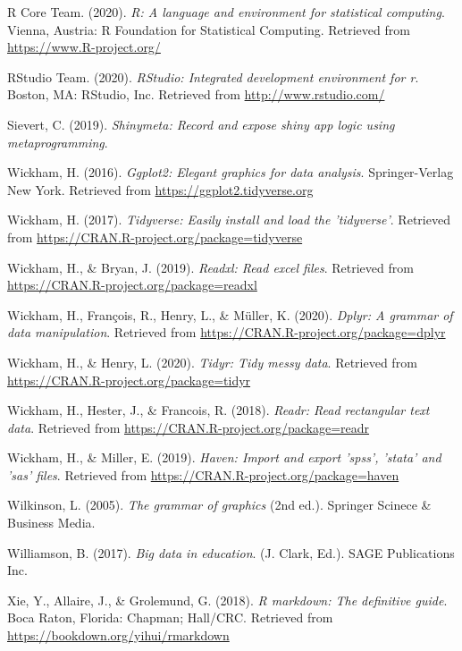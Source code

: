 \documentclass[english,man,floatsintext]{apa6}
\begin{document}
\leavevmode\hypertarget{ref-R-base}{}%
R Core Team. (2020). \emph{R: A language and environment for statistical computing}. Vienna, Austria: R Foundation for Statistical Computing. Retrieved from \url{https://www.R-project.org/}

\leavevmode\hypertarget{ref-rstudio}{}%
RStudio Team. (2020). \emph{RStudio: Integrated development environment for r}. Boston, MA: RStudio, Inc. Retrieved from \url{http://www.rstudio.com/}

\leavevmode\hypertarget{ref-R-shinymeta}{}%
Sievert, C. (2019). \emph{Shinymeta: Record and expose shiny app logic using metaprogramming}.

\leavevmode\hypertarget{ref-R-ggplot2}{}%
Wickham, H. (2016). \emph{Ggplot2: Elegant graphics for data analysis}. Springer-Verlag New York. Retrieved from \url{https://ggplot2.tidyverse.org}

\leavevmode\hypertarget{ref-tidyverse}{}%
Wickham, H. (2017). \emph{Tidyverse: Easily install and load the 'tidyverse'}. Retrieved from \url{https://CRAN.R-project.org/package=tidyverse}

\leavevmode\hypertarget{ref-R-readxl}{}%
Wickham, H., \& Bryan, J. (2019). \emph{Readxl: Read excel files}. Retrieved from \url{https://CRAN.R-project.org/package=readxl}

\leavevmode\hypertarget{ref-R-dplyr}{}%
Wickham, H., François, R., Henry, L., \& Müller, K. (2020). \emph{Dplyr: A grammar of data manipulation}. Retrieved from \url{https://CRAN.R-project.org/package=dplyr}

\leavevmode\hypertarget{ref-R-tidyr}{}%
Wickham, H., \& Henry, L. (2020). \emph{Tidyr: Tidy messy data}. Retrieved from \url{https://CRAN.R-project.org/package=tidyr}

\leavevmode\hypertarget{ref-R-readr}{}%
Wickham, H., Hester, J., \& Francois, R. (2018). \emph{Readr: Read rectangular text data}. Retrieved from \url{https://CRAN.R-project.org/package=readr}

\leavevmode\hypertarget{ref-R-haven}{}%
Wickham, H., \& Miller, E. (2019). \emph{Haven: Import and export 'spss', 'stata' and 'sas' files}. Retrieved from \url{https://CRAN.R-project.org/package=haven}

\leavevmode\hypertarget{ref-grammar}{}%
Wilkinson, L. (2005). \emph{The grammar of graphics} (2nd ed.). Springer Scinece \& Business Media.

\leavevmode\hypertarget{ref-bigdata2}{}%
Williamson, B. (2017). \emph{Big data in education}. (J. Clark, Ed.). SAGE Publications Inc.

\leavevmode\hypertarget{ref-R-rmarkdown}{}%
Xie, Y., Allaire, J., \& Grolemund, G. (2018). \emph{R markdown: The definitive guide}. Boca Raton, Florida: Chapman; Hall/CRC. Retrieved from \url{https://bookdown.org/yihui/rmarkdown}

\endgroup
\end{document}
